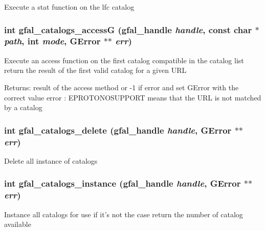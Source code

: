 Execute a stat function on the lfc catalog 
\subsubsection{\setlength{\rightskip}{0pt plus 5cm}int gfal\_\-catalogs\_\-access\-G (gfal\_\-handle {\em handle}, const char $\ast$ {\em path}, int {\em mode}, GError $\ast$$\ast$ {\em err})}\label{gfal__common__catalog_8c_4fd85b35f2134b73207c12b54e85959d}


Execute an access function on the first catalog compatible in the catalog list return the result of the first valid catalog for a given URL \begin{Desc}
\item[Returns:]result of the access method or -1 if error and set GError with the correct value error : EPROTONOSUPPORT means that the URL is not matched by a catalog \end{Desc}
\subsubsection{\setlength{\rightskip}{0pt plus 5cm}int gfal\_\-catalogs\_\-delete (gfal\_\-handle {\em handle}, GError $\ast$$\ast$ {\em err})}\label{gfal__common__catalog_8c_c0412247b6ddd6ceac7fb171c56adaad}


Delete all instance of catalogs 
\subsubsection{\setlength{\rightskip}{0pt plus 5cm}int gfal\_\-catalogs\_\-instance (gfal\_\-handle {\em handle}, GError $\ast$$\ast$ {\em err})}\label{gfal__common__catalog_8c_96ebd098ad2447a81f096207879b9d3a}


Instance all catalogs for use if it's not the case return the number of catalog available 
